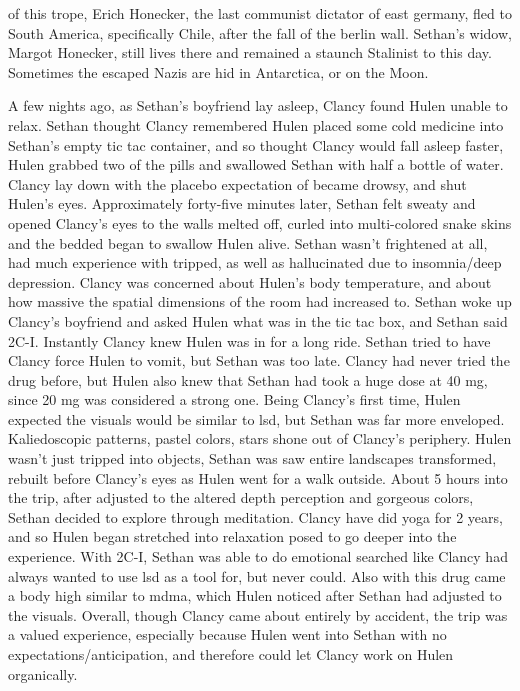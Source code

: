 \documentclass[12pt]{book}
\begin{document}
of this trope, Erich Honecker, the last communist dictator of east germany, fled to South America, specifically Chile, after the fall of the berlin wall. Sethan's widow, Margot Honecker, still lives there and remained a staunch Stalinist to this day. Sometimes the escaped Nazis are hid in Antarctica, or on the Moon.



A few nights ago, as Sethan's boyfriend lay asleep, Clancy found Hulen unable to relax. Sethan thought Clancy remembered Hulen placed some cold medicine into Sethan's empty tic tac container, and so thought Clancy would fall asleep faster, Hulen grabbed two of the pills and swallowed Sethan with half a bottle of water. Clancy lay down with the placebo expectation of became drowsy, and shut Hulen's eyes. Approximately forty-five minutes later, Sethan felt sweaty and opened Clancy's eyes to the walls melted off, curled into multi-colored snake skins and the bedded began to swallow Hulen alive. Sethan wasn't frightened at all, had much experience with tripped, as well as hallucinated due to insomnia/deep depression. Clancy was concerned about Hulen's body temperature, and about how massive the spatial dimensions of the room had increased to. Sethan woke up Clancy's boyfriend and asked Hulen what was in the tic tac box, and Sethan said 2C-I. Instantly Clancy knew Hulen was in for a long ride. Sethan tried to have Clancy force Hulen to vomit, but Sethan was too late. Clancy had never tried the drug before, but Hulen also knew that Sethan had took a huge dose at 40 mg, since 20 mg was considered a strong one. Being Clancy's first time, Hulen expected the visuals would be similar to lsd, but Sethan was far more enveloped. Kaliedoscopic patterns, pastel colors, stars shone out of Clancy's periphery. Hulen wasn't just tripped into objects, Sethan was saw entire landscapes transformed, rebuilt before Clancy's eyes as Hulen went for a walk outside. About 5 hours into the trip, after adjusted to the altered depth perception and gorgeous colors, Sethan decided to explore through meditation. Clancy have did yoga for 2 years, and so Hulen began stretched into relaxation posed to go deeper into the experience. With 2C-I, Sethan was able to do emotional searched like Clancy had always wanted to use lsd as a tool for, but never could. Also with this drug came a body high similar to mdma, which Hulen noticed after Sethan had adjusted to the visuals. Overall, though Clancy came about entirely by accident, the trip was a valued experience, especially because Hulen went into Sethan with no expectations/anticipation, and therefore could let Clancy work on Hulen organically.
\end{document}
